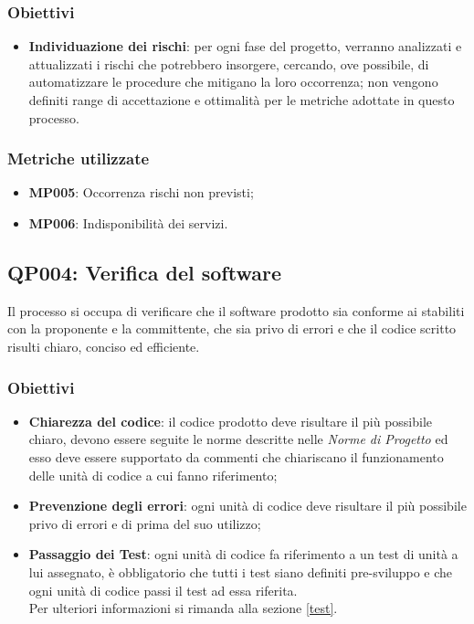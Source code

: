 \subsubsection{Obiettivi}
\begin{itemize}
	\item \textbf{Individuazione dei rischi}: per ogni fase del progetto, verranno analizzati e attualizzati i rischi che potrebbero insorgere, cercando, ove possibile, di automatizzare le procedure che mitigano la loro occorrenza; non vengono definiti range di accettazione e ottimalità per le metriche adottate in questo processo.
\end{itemize}

\subsubsection{Metriche utilizzate}
\begin{itemize}	
	\item \textbf{MP005}: Occorrenza rischi non previsti;
	\item \textbf{MP006}: Indisponibilità dei servizi.
\end{itemize}
\subsection{QP004: Verifica del software}
Il processo si occupa di verificare che il software prodotto sia conforme ai  stabiliti con la proponente e la committente, che sia privo di errori e che il codice scritto risulti chiaro, conciso ed efficiente.
\subsubsection{Obiettivi}
\begin{itemize}
	\item \textbf{Chiarezza del codice}: il codice prodotto deve risultare il più possibile chiaro, devono essere seguite le norme descritte nelle \textit{Norme di Progetto} ed esso deve essere supportato da commenti che chiariscano il funzionamento delle unità di codice a cui fanno riferimento;
	\item \textbf{Prevenzione degli errori}: ogni unità di codice deve risultare il più possibile privo di errori e di  prima del suo utilizzo;
	\item \textbf{Passaggio dei Test}: ogni unità di codice fa riferimento a un test di unità a lui assegnato, è obbligatorio che tutti i test siano definiti pre-sviluppo e che ogni unità di codice passi il test ad essa riferita.\\
	Per ulteriori informazioni si rimanda alla sezione \ref{test}.
\end{itemize}
